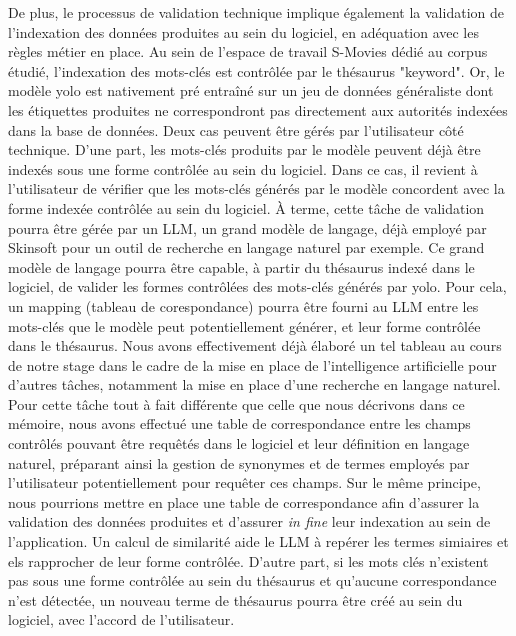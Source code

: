 De plus, le processus de validation technique implique également la validation de l'indexation des données produites au sein du logiciel, en adéquation avec les règles métier en place. Au sein de l’espace de travail S-Movies dédié au corpus étudié, l'indexation des mots-clés est contrôlée par le thésaurus "keyword". Or, le modèle \gls{yolo} est nativement pré entraîné sur un jeu de données généraliste dont les étiquettes produites ne correspondront pas directement aux autorités indexées dans la base de données. Deux cas peuvent être gérés par l'utilisateur côté technique. D'une part, les mots-clés produits par le modèle peuvent déjà être indexés sous une forme contrôlée au sein du logiciel. Dans ce cas, il revient à l'utilisateur de vérifier que les mots-clés générés par le modèle concordent avec la forme indexée contrôlée au sein du logiciel. À terme, cette tâche de validation pourra être gérée par un LLM, un grand modèle de langage, déjà employé par Skinsoft pour un outil de recherche en langage naturel par exemple. Ce grand modèle de langage pourra être capable, à partir du thésaurus indexé dans le logiciel, de valider les formes contrôlées des mots-clés générés par \gls{yolo}. Pour cela, un mapping (tableau de corespondance) pourra être fourni au LLM entre les mots-clés que le modèle peut potentiellement générer, et leur forme contrôlée dans le thésaurus. Nous avons effectivement déjà élaboré un tel tableau au cours de notre stage dans le cadre de la mise en place de l'intelligence artificielle pour d'autres tâches, notamment la mise en place d'une recherche en langage naturel. Pour cette tâche tout à fait différente que celle que nous décrivons dans ce mémoire, nous avons effectué une table de correspondance entre les champs contrôlés pouvant être requêtés dans le logiciel et leur définition en langage naturel, préparant ainsi la gestion de synonymes et de termes employés par l'utilisateur potentiellement pour requêter ces champs. Sur le même principe, nous pourrions mettre en place une table de correspondance afin d'assurer la validation des données produites et d'assurer \textit{in fine} leur indexation au sein de l'application. Un calcul de similarité aide le LLM à repérer les termes simiaires et els rapprocher de leur forme contrôlée.
D'autre part, si les mots clés n'existent pas sous une forme contrôlée au sein du thésaurus et qu'aucune correspondance n'est détectée, un nouveau terme de thésaurus pourra être créé au sein du logiciel, avec l'accord de l'utilisateur.



